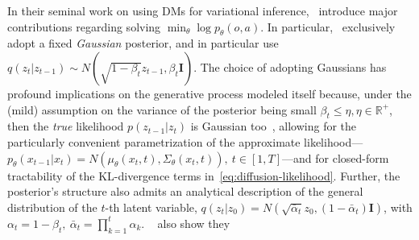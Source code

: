 In their seminal work on using DMs for variational inference,~\citet{hoDenoisingDiffusionProbabilistic2020} introduce major contributions regarding solving \( \min_\theta \log p_\theta(o,a) \).
In particular,~\citet{hoDenoisingDiffusionProbabilistic2020} exclusively adopt a fixed \emph{Gaussian} posterior, and in particular use \( q(z_t \vert z_{t-1}) \sim N(\sqrt{1-\beta_t}z_{t-1}, \beta_t \mathbf I) \).
The choice of adopting Gaussians has profound implications on the generative process modeled itself because, under the (mild) assumption on the variance of the posterior being small \( \beta_t \leq \eta, \eta \in \mathbb R^+ \), then the \emph{true} likelihood \( p(z_{t-1} \vert z_t) \) is Gaussian too~\citep{sohl-dicksteinDeepUnsupervisedLearning2015}, allowing for the particularly convenient parametrization of the approximate likelihood---\( p_\theta (x_{t-1} \vert x_t) = N(\mu_\theta(x_t, t), \Sigma_\theta(x_t,t)), \ t \in [1,T] \)---and for closed-form tractability of the KL-divergence terms in~\ref{eq:diffusion-likelihood}.
Further, the posterior's structure also admits an analytical description of the general distribution of the \( t\)-th latent variable, \( q(z_t \vert z_0) = N (\sqrt{\bar{\alpha}_t}z_0, (1-\bar{\alpha}_t) \mathbf{I}) \), with \( \alpha_t = 1-\beta_t, \ \bar \alpha_t = \prod_{k=1}^t \alpha_k \).
~\citet{hoDenoisingDiffusionProbabilistic2020} also show they 

